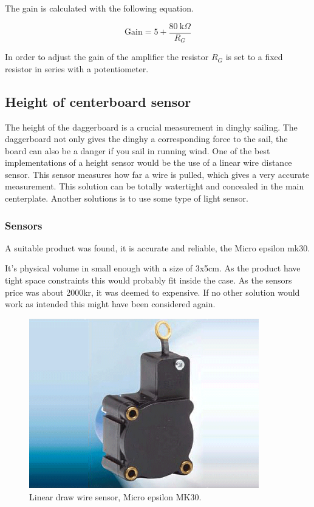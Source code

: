 The gain is calculated with the following equation.  

\begin{equation}
\textrm{Gain} = 5 + \frac{80~\textrm{k}\Omega}{R_G}
\end{equation}

In order to adjust the gain of the amplifier the resistor $R_G$ is set to a fixed resistor in series with a potentiometer.


\subsection{Height of centerboard sensor}
The height of the daggerboard is a crucial measurement in dinghy sailing. The daggerboard not only gives the dinghy a corresponding force to the sail, the board can also be a danger if you sail in running wind. One of the best implementations of a height sensor would be the use of a linear wire distance sensor. This sensor measures how far a wire is pulled, which gives a very accurate measurement. This solution can be totally watertight and concealed in the main centerplate. Another solutions is to use some type of light sensor. 

\subsubsection{Sensors}


A suitable product was found, it is accurate and reliable, the Micro epsilon mk30\cite{micro-epsilon-mk30}.

It's physical volume in small enough with a size of 3x5cm. As the product have tight space constraints this would probably fit inside the case. As the sensors price was about 2000kr, it was deemed to expensive. If no other solution would work as intended this might have been considered again.

\begin{figure}[H]
\begin{center}
	\includegraphics[width = 10cm]{Figures/microepsilon_mk30.png}
	\caption{Linear draw wire sensor, Micro epsilon MK30.}
	\label{Draw_sensor}
\end{center}
\end{figure}



